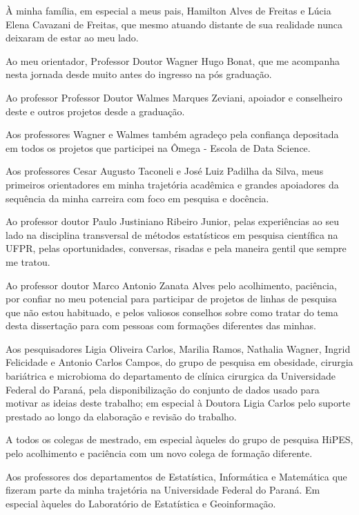 \begin{agradece}	%

À minha família, em especial a meus pais, Hamilton Alves de Freitas e Lúcia Elena Cavazani de Freitas, que mesmo atuando distante de sua realidade nunca deixaram de estar ao meu lado.

Ao meu orientador, Professor Doutor Wagner Hugo Bonat, que me acompanha nesta jornada desde muito antes do ingresso na pós graduação.

Ao professor Professor Doutor Walmes Marques Zeviani, apoiador e conselheiro deste e outros projetos desde a graduação.

Aos professores Wagner e Walmes também agradeço pela confiança depositada em todos os projetos que participei na Ômega - Escola de Data Science.

Aos professores Cesar Augusto Taconeli e José Luiz Padilha da Silva, meus primeiros orientadores em minha trajetória acadêmica e grandes apoiadores da sequência da minha carreira com foco em pesquisa e docência.

Ao professor doutor Paulo Justiniano Ribeiro Junior, pelas experiências ao seu lado na disciplina transversal de métodos estatísticos em pesquisa científica na UFPR, pelas oportunidades, conversas, risadas e pela maneira gentil que sempre me tratou.

Ao professor doutor Marco Antonio Zanata Alves pelo acolhimento, paciência, por confiar no meu potencial para participar de projetos de linhas de pesquisa que não estou habituado, e pelos valiosos conselhos sobre como tratar do tema desta dissertação para com pessoas com formações diferentes das minhas.

Aos pesquisadores Ligia Oliveira Carlos, Marilia Ramos, Nathalia Wagner, Ingrid Felicidade e Antonio Carlos Campos, do grupo de pesquisa em obesidade, cirurgia bariátrica e microbioma do departamento de clínica cirurgica da Universidade Federal do Paraná, pela disponibilização do conjunto de dados usado para motivar as ideias deste trabalho; em especial à Doutora Ligia Carlos pelo suporte prestado ao longo da elaboração e revisão do trabalho.

A todos os colegas de mestrado, em especial àqueles do grupo de pesquisa HiPES, pelo acolhimento e paciência com um novo colega de formação diferente.

Aos professores dos departamentos de Estatística, Informática e Matemática que fizeram parte da minha trajetória na Universidade Federal do Paraná. Em especial àqueles do Laboratório de Estatística e Geoinformação. 


\end{agradece}
